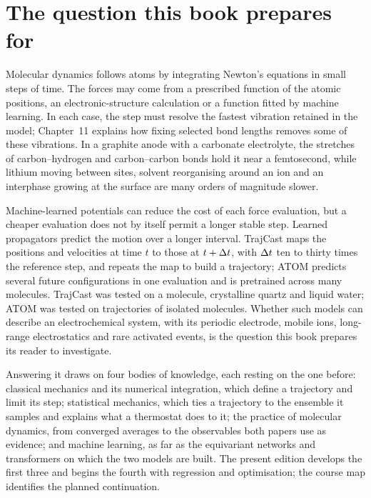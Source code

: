 \section{The question this book prepares for}
\label{sec:or-question}

Molecular dynamics follows atoms by integrating Newton's equations in small
steps of time. The forces may come from a prescribed function of the
atomic positions, an electronic-structure calculation or a function fitted
by machine learning. In each case, the step must resolve the fastest
vibration retained in the model; Chapter~11 explains how fixing selected
bond lengths removes some of these vibrations. In a graphite anode with a
carbonate electrolyte, the stretches of carbon--hydrogen and carbon--carbon
bonds hold it near a femtosecond, while lithium moving between sites,
solvent reorganising around an ion and an interphase growing at the surface
are many orders of magnitude slower.

Machine-learned potentials can reduce the cost of each force evaluation,
but a cheaper evaluation does not by itself permit a longer stable step.
Learned propagators predict the motion over a longer interval. TrajCast maps
the positions and velocities at time $t$ to those at $t + \Delta t$, with $\Delta t$
ten to thirty times the reference step, and repeats the map to build a
trajectory\cite{Thiemann2026}; ATOM predicts several future configurations
in one evaluation and is pretrained across many molecules\cite{Thompson2026}.
TrajCast was tested on a molecule, crystalline quartz and liquid water;
ATOM was tested on trajectories of isolated molecules. Whether such
models can describe an electrochemical system, with its periodic electrode,
mobile ions, long-range electrostatics and rare activated events, is the
question this book prepares its reader to investigate.

Answering it draws on four bodies of knowledge, each resting on the one
before: classical mechanics and its numerical integration, which define a
trajectory and limit its step; statistical mechanics, which ties a
trajectory to the ensemble it samples and explains what a thermostat does
to it; the practice of molecular dynamics, from converged averages to the
observables both papers use as evidence; and machine learning, as far as the
equivariant networks and transformers on which the two models are built.
The present edition develops the first three and begins the fourth with
regression and optimisation; the course map identifies the planned
continuation.
